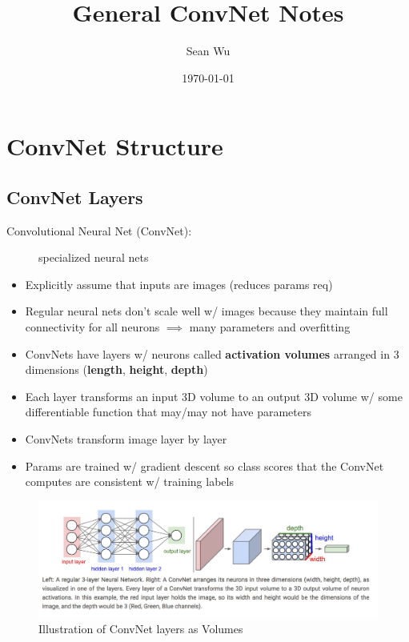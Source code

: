 \documentclass[a4paper,12pt]{article}
\begin{document}
\title{General ConvNet Notes}
\author{Sean Wu}
\date{\today}
\maketitle

\tableofcontents

\pagebreak

\setlength{\parindent}{0em}
\setlength{\parskip}{1em}

\section{ConvNet Structure}

\subsection{ConvNet Layers}
\begin{description}
  \item[Convolutional Neural Net (ConvNet):] specialized neural nets
\end{description}
\begin{itemize}
  \item Explicitly assume that inputs are images (reduces params req)
  \item Regular neural nets don't scale well w/ images because they maintain full connectivity for all neurons $\implies$ many parameters and overfitting
  \item ConvNets have layers w/ neurons called \textbf{activation volumes} arranged in 3 dimensions (\textbf{length}, \textbf{height}, \textbf{depth})
  \item Each layer transforms an input 3D volume to an output 3D volume w/ some differentiable function that may/may not have parameters
  \item ConvNets transform image layer by layer
  \item Params are trained w/ gradient descent so class scores that the ConvNet computes are consistent w/ training labels
\end{itemize}

\begin{figure}[th]
  \centering
  \includegraphics[width=165mm, scale=1]{images/ConvNet-Volumes.png}
  \caption{Illustration of ConvNet layers as Volumes}
  \label{Volumes}
\end{figure}
\end{document}
